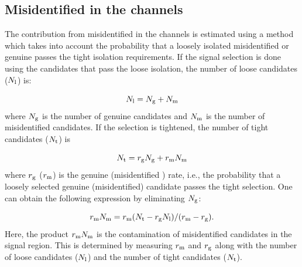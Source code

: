 \subsection{\texorpdfstring{Misidentified \Tau in the \leptonTau channels}{Misidentified tau in the lepton-tau channels}}
\label{sect:bkgFake}
The contribution from misidentified \Tau in the \leptonTau channels is estimated using a method which takes into account the probability 
that a loosely isolated misidentified or genuine \Tau passes the tight isolation requirements.
If the signal selection is done using the \Tau candidates that pass the loose isolation, 
the number of loose \Tau candidates ($N_{\rm l}$) is:

\begin{equation}
N_{\rm l} = N_{\rm g} + N_{\rm m}
\end{equation}
where $N_{\rm g}$ is the number of genuine \Tau candidates and $N_{\rm m}$ is the number of misidentified 
\Tau candidates. If the selection is tightened, the number of tight \Tau candidates ($N_{\rm t}$)  is

\begin{equation}
 N_{\rm t} = r_{\rm g} N_{\rm g} + r_{\rm m} N_{\rm m}
\end{equation} 
where $r_{\rm g}$ ($r_{\rm m}$) is the genuine (misidentified \Tau) rate, i.e., the probability that a loosely selected genuine (misidentified) \Tau candidate passes the  tight  selection. 
One can obtain the following expression by eliminating $N_{\rm g}$:

\begin{equation}
   r_{\rm m} N_{\rm m}  = r_{\rm m} (N_{\rm t} - r_{\rm g} N_{\rm l})/(r_{\rm m}-r_{\rm g}).
\end{equation}
Here, the product $r_{\rm m} N_{\rm m}$ is the contamination of misidentified \Tau candidates in the signal region. This is determined by measuring $r_{\rm m}$ and $r_{\rm g}$ along with the number of loose \Tau candidates ($N_{\rm l}$) and the number of tight \Tau candidates ($N_{\rm t}$).

